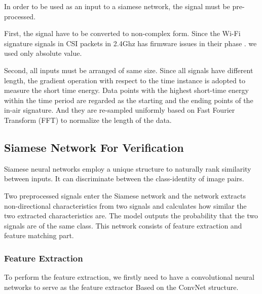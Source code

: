 \documentclass[runningheads]{llncs}
\begin{document}
In order to be used as an input to a siamese network, the signal must be pre-processed.

First, the signal have to be converted to non-complex form.
Since the Wi-Fi signature signals in CSI packets in 2.4Ghz has firmware issues in their phase \cite{wang2015understanding}. we used only absolute value.

Second, all inputs must be arranged of same size.
Since all signals have different length, the gradient operation with respect to the time instance is adopted to measure the short time energy. 
Data points with the highest short-time energy within the time period are regarded as the starting and the ending points of the in-air signature.
And they are re-sampled uniformly based on Fast Fourier Transform (FFT)  to normalize the length of the data. \cite{moon2017air}


\subsection{Siamese Network For Verification}


Siamese neural networks employ a unique structure to naturally rank similarity between inputs. It can discriminate between the class-identity of image pairs.
\cite{koch2015siamese}

Two preprocessed signals enter the Siamese network and the network extracts non-directional characteristics from two signals and calculates how similar the two extracted characteristics are. The model outputs the probability that the two signals are of the same class. %
This network consists of feature extraction and feature matching part.

\subsubsection{Feature Extraction}

To perform the feature extraction, we firstly need to have a convolutional neural networks to serve as the feature extractor
Based on the ConvNet structure. \cite{lecun1998gradient} 
\end{document}
